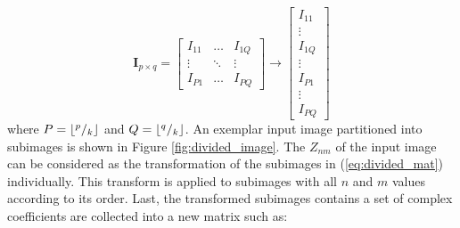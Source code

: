 \documentclass[]{spie}  %
\DeclarePairedDelimiter\floor{\lfloor}{\rfloor}
\begin{document}
\begin{equation}
\mathbf{I}_{p\times q} = \begin{bmatrix}
 I_{11} & \hdots & I_{1Q} \\
 \vdots & \ddots & \vdots \\
 I_{P1} & \hdots & I_{PQ} 
 \end{bmatrix}
 \longrightarrow
 \begin{bmatrix}
 I_{11} \\
 \vdots \\
 I_{1Q} \\
 \vdots \\
 I_{P1} \\
 \vdots \\
 I_{PQ}
 \end{bmatrix}
 \label{eq:divided_mat}
\end{equation}
where $P=\floor*{^p/_k}$ and $Q=\floor*{^q/_k}$. An exemplar input image partitioned into subimages is shown in Figure \ref{fig:divided_image}. The $Z_{nm}$ of the input image can be considered as the transformation of the subimages in (\ref{eq:divided_mat}) individually. This transform is applied to subimages with all $n$ and $m$ values according to its order. Last, the transformed subimages contains a set of complex coefficients are collected into a new matrix such as:
\end{document}
